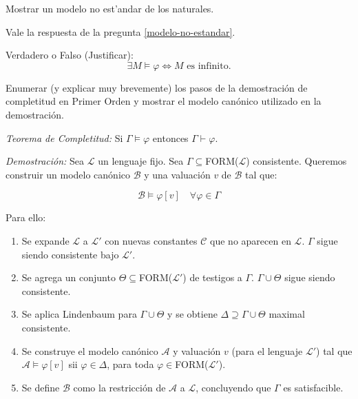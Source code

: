 \begin{questions}
\question Mostrar un modelo no est'andar de los naturales. 

\begin{solution} 
Vale la respuesta de la pregunta \ref{modelo-no-estandar}.
\end{solution}

\question Verdadero o Falso (Justificar):
  \begin{equation*}
    \exists M \vDash \varphi \Leftrightarrow M \text{ es infinito.}
  \end{equation*}

\question Enumerar (y explicar muy brevemente) los pasos de la demostraci\'on de completitud en Primer Orden y mostrar el modelo can\'onico utilizado en la demostraci\'on.

\begin{solution}

 {\it Teorema de Completitud: } Si $\Gamma\vDash\varphi$ entonces $\Gamma\vdash\varphi$.
 
 {\it Demostraci\'on: } Sea $\mathcal{L}$ un lenguaje fijo. Sea $\Gamma\subseteq$FORM($\mathcal{L}$) consistente. Queremos construir un modelo can\'onico $\mathcal{B}$ y una valuaci\'on $v$ de $\mathcal{B}$ tal que: 
 
 \begin{equation*}
  \mathcal{B}\vDash\varphi[v] \quad\forall\varphi\in\Gamma
 \end{equation*}

 Para ello: 
 \begin{enumerate}
  \item Se expande $\mathcal{L}$ a $\mathcal{L}'$ con nuevas constantes $\mathcal{C}$ que no aparecen en $\mathcal{L}$. $\Gamma$ sigue siendo consistente bajo $\mathcal{L}'$. 
  \item Se agrega un conjunto $\Theta\subseteq$FORM($\mathcal{L}'$) de testigos a $\Gamma$. $\Gamma\cup\Theta$ sigue siendo consistente. 
  \item Se aplica Lindenbaum para $\Gamma\cup\Theta$ y se obtiene $\Delta\supseteq\Gamma\cup\Theta$ maximal consistente.
  \item Se construye el modelo can\'onico $\mathcal{A}$ y valuaci\'on $v$ (para el lenguaje $\mathcal{L}'$) tal que $\mathcal{A}\vDash\varphi[v]$ sii $\varphi\in\Delta$, para toda $\varphi\in$FORM($\mathcal{L}'$).
  \item Se define $\mathcal{B}$ como la restricci\'on de $\mathcal{A}$ a $\mathcal{L}$, concluyendo que $\Gamma$ es satisfacible. 
 \end{enumerate}


\end{solution}
\end{questions}
